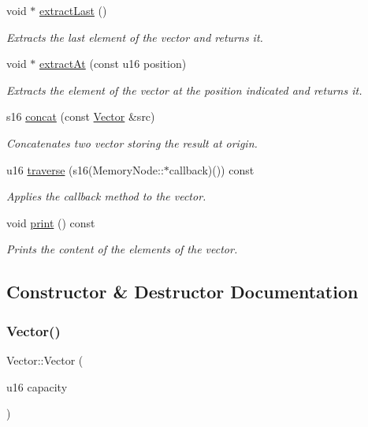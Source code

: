 \begin{DoxyCompactItemize}
void $\ast$ \hyperlink{class_vector_ae7cf9b7f0c345589098036e367b5729f}{extract\+Last} ()
\begin{DoxyCompactList}\small\item\em Extracts the last element of the vector and returns it. \end{DoxyCompactList}\item 
void $\ast$ \hyperlink{class_vector_aae8d43ca6747949bfe322c71d961c9a6}{extract\+At} (const u16 position)
\begin{DoxyCompactList}\small\item\em Extracts the element of the vector at the position indicated and returns it. \end{DoxyCompactList}\item 
s16 \hyperlink{class_vector_a7fff9a3f12f5ffe8a132e81a55c04f70}{concat} (const \hyperlink{class_vector}{Vector} \&src)
\begin{DoxyCompactList}\small\item\em Concatenates two vector storing the result at origin. \end{DoxyCompactList}\item 
u16 \hyperlink{class_vector_a2ccabd5bd543d4f56db38c9c2e8fdd4d}{traverse} (s16(Memory\+Node\+::$\ast$callback)()) const
\begin{DoxyCompactList}\small\item\em Applies the callback method to the vector. \end{DoxyCompactList}\item 
void \hyperlink{class_vector_aa9d204c1e8c6f232e5391ebc57e8edd2}{print} () const
\begin{DoxyCompactList}\small\item\em Prints the content of the elements of the vector. \end{DoxyCompactList}\end{DoxyCompactItemize}


\subsection{Constructor \& Destructor Documentation}
\mbox{\label{class_vector_a9467d86e33600527022d24e2c55bd898}} 
\subsubsection{\texorpdfstring{Vector()}{Vector()}\hspace{0.1cm}{\footnotesize\ttfamily [1/2]}}
{\footnotesize\ttfamily Vector\+::\+Vector (\begin{DoxyParamCaption}\item[{u16}]{capacity }\end{DoxyParamCaption})}



